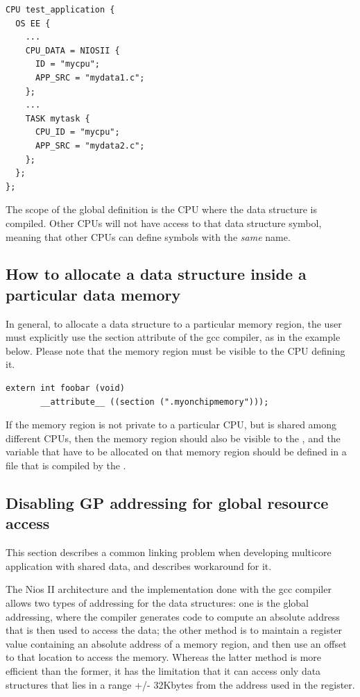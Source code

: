 \begin{lstlisting}
CPU test_application {
  OS EE {
    ...
    CPU_DATA = NIOSII {
      ID = "mycpu";
      APP_SRC = "mydata1.c";
    };
    ...
    TASK mytask {
      CPU_ID = "mycpu";
      APP_SRC = "mydata2.c";
    };
  };
};    
\end{lstlisting}

 \begin{warning}
The scope of the global definition is the CPU where the data
 structure is compiled. Other CPUs will not have access to that data
 structure symbol, meaning that other CPUs can define symbols with the
 {\em same} name.
\end{warning}


\subsection{How to allocate a data structure inside a particular 
data memory}

In general, to allocate a data structure to a particular memory
region, the user must explicitly use the section attribute of the gcc
compiler, as in the example below. Please note that the memory region
must be visible to the CPU defining it.

\begin{lstlisting}
extern int foobar (void) 
       __attribute__ ((section (".myonchipmemory")));
\end{lstlisting}

\begin{warning}
  If the memory region is not private to a particular CPU, but is
  shared among different CPUs, then the memory region should also be
  visible to the , and the variable that have to be
  allocated on that memory region should be defined in a file that is
  compiled by the .
\end{warning}





\subsection{Disabling GP addressing for global resource access}
\label{sec:GP-disabling}
This section describes a common linking problem when developing
multicore application with shared data, and describes workaround
for it.

The Nios II architecture and the implementation done with the gcc
compiler allows two types of addressing for the data structures: one
is the global addressing, where the compiler generates code to compute
an absolute address that is then used to access the data; the other
method is to maintain a register value containing an absolute address
of a memory region, and then use an offset to that location to access
the memory. Whereas the latter method is more efficient than the
former, it has the limitation that it can access only data structures
that lies in a range +/- 32Kbytes from the address used in the
register.

